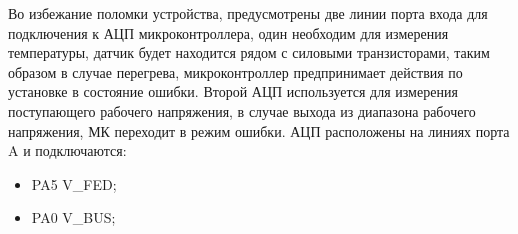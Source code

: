 \begin{figure}[H]
  \end{figure}

Во избежание поломки устройства, предусмотрены две линии порта входа для подключения к АЦП микроконтроллера, один необходим для измерения температуры, датчик будет находится рядом с силовыми транзисторами, таким образом в случае перегрева, микроконтроллер предпринимает действия по установке в состояние ошибки. Второй АЦП используется для измерения поступающего рабочего напряжения, в случае выхода из диапазона рабочего напряжения, МК переходит в режим ошибки. АЦП расположены на линиях порта A и подключаются:

\begin{itemize}
    \item PA5 \rightarrow V\_FED;
    \item PA0 \rightarrow V\_BUS;
\end{itemize}


